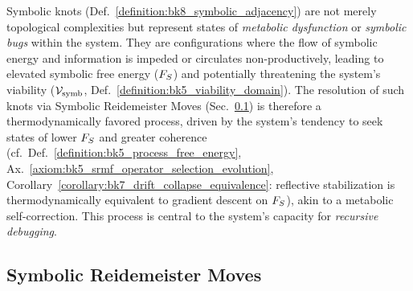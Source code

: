 \begin{scholium}
\label{scholium:bk8_symbolic_knots_as_metabolic_dysfunctions}
Symbolic knots (Def.~\ref{definition:bk8_symbolic_adjacency}) are not merely topological complexities but represent states of \emph{metabolic dysfunction} or \emph{symbolic bugs} within the system. They are configurations where the flow of symbolic energy and information is impeded or circulates non-productively, leading to elevated symbolic free energy ($F_S$) and potentially threatening the system's viability ($\mathcal{V}_{\mathrm{symb}}$, Def.~\ref{definition:bk5_viability_domain}). The resolution of such knots via Symbolic Reidemeister Moves (Sec.~\ref{subsec:bk8_module_braid_topology}) is therefore a thermodynamically favored process, driven by the system's tendency to seek states of lower $F_S$ and greater coherence (cf.~Def.~\ref{definition:bk5_process_free_energy}, Ax.~\ref{axiom:bk5_srmf_operator_selection_evolution}, Corollary~\ref{corollary:bk7_drift_collapse_equivalence}: reflective stabilization is thermodynamically equivalent to gradient descent on $F_S$), akin to a metabolic self-correction. This process is central to the system's capacity for \emph{recursive debugging}.
\end{scholium}
\subsection{Symbolic Reidemeister Moves}
\label{subsec:bk8_module_braid_topology}

